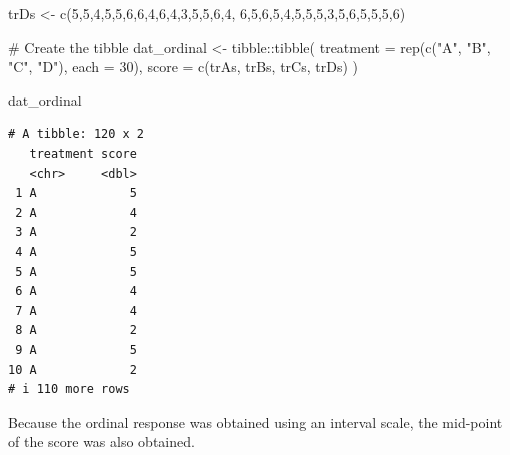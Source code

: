 \documentclass[
  letterpaper,
]{book}
\newenvironment{Shaded}{\begin{snugshade}}{\end{snugshade}}
\newcommand{\AttributeTok}[1]{\textcolor[rgb]{0.40,0.45,0.13}{#1}}
\newcommand{\CommentTok}[1]{\textcolor[rgb]{0.37,0.37,0.37}{#1}}
\newcommand{\DecValTok}[1]{\textcolor[rgb]{0.68,0.00,0.00}{#1}}
\newcommand{\FunctionTok}[1]{\textcolor[rgb]{0.28,0.35,0.67}{#1}}
\newcommand{\NormalTok}[1]{\textcolor[rgb]{0.00,0.23,0.31}{#1}}
\newcommand{\OtherTok}[1]{\textcolor[rgb]{0.00,0.23,0.31}{#1}}
\newcommand{\SpecialCharTok}[1]{\textcolor[rgb]{0.37,0.37,0.37}{#1}}
\newcommand{\StringTok}[1]{\textcolor[rgb]{0.13,0.47,0.30}{#1}}
\begin{document}
\begin{Shaded}
\begin{Highlighting}[]
\NormalTok{trDs }\OtherTok{\textless{}{-}} \FunctionTok{c}\NormalTok{(}\DecValTok{5}\NormalTok{,}\DecValTok{5}\NormalTok{,}\DecValTok{4}\NormalTok{,}\DecValTok{5}\NormalTok{,}\DecValTok{5}\NormalTok{,}\DecValTok{6}\NormalTok{,}\DecValTok{6}\NormalTok{,}\DecValTok{4}\NormalTok{,}\DecValTok{6}\NormalTok{,}\DecValTok{4}\NormalTok{,}\DecValTok{3}\NormalTok{,}\DecValTok{5}\NormalTok{,}\DecValTok{5}\NormalTok{,}\DecValTok{6}\NormalTok{,}\DecValTok{4}\NormalTok{,}
          \DecValTok{6}\NormalTok{,}\DecValTok{5}\NormalTok{,}\DecValTok{6}\NormalTok{,}\DecValTok{5}\NormalTok{,}\DecValTok{4}\NormalTok{,}\DecValTok{5}\NormalTok{,}\DecValTok{5}\NormalTok{,}\DecValTok{5}\NormalTok{,}\DecValTok{3}\NormalTok{,}\DecValTok{5}\NormalTok{,}\DecValTok{6}\NormalTok{,}\DecValTok{5}\NormalTok{,}\DecValTok{5}\NormalTok{,}\DecValTok{5}\NormalTok{,}\DecValTok{6}\NormalTok{)}

\CommentTok{\# Create the tibble}
\NormalTok{dat\_ordinal }\OtherTok{\textless{}{-}}\NormalTok{ tibble}\SpecialCharTok{::}\FunctionTok{tibble}\NormalTok{(}
  \AttributeTok{treatment =} \FunctionTok{rep}\NormalTok{(}\FunctionTok{c}\NormalTok{(}\StringTok{"A"}\NormalTok{, }\StringTok{"B"}\NormalTok{, }\StringTok{"C"}\NormalTok{, }\StringTok{"D"}\NormalTok{), }
                  \AttributeTok{each =} \DecValTok{30}\NormalTok{),}
  \AttributeTok{score =} \FunctionTok{c}\NormalTok{(trAs, trBs, trCs, trDs)}
\NormalTok{)}

\NormalTok{dat\_ordinal}
\end{Highlighting}
\end{Shaded}

\begin{verbatim}
# A tibble: 120 x 2
   treatment score
   <chr>     <dbl>
 1 A             5
 2 A             4
 3 A             2
 4 A             5
 5 A             5
 6 A             4
 7 A             4
 8 A             2
 9 A             5
10 A             2
# i 110 more rows
\end{verbatim}

Because the ordinal response was obtained using an interval scale, the
mid-point of the score was also obtained.
\end{document}
